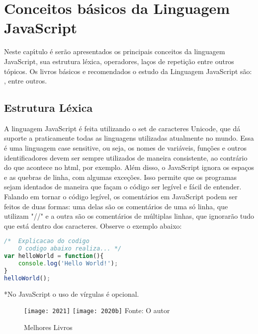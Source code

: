 


\chapter{ Conceitos b\'{a}sicos da Linguagem JavaScript}

Neste cap\'{\i}tulo \'{e} serão apresentados os principais conceitos da linguagem JavaScript, sua estrutura léxica, operadores, laços de repetição entre outros tópicos.
Os livros b\'{a}sicos e recomendados o estudo da Linguagem JavaScript s\~{a}o: \cite{flanagan2020javascript}, \cite{powers2015javascript} entre outros.


\section{Estrutura Léxica}
A linguagem JavaScript é feita utilizando o set de caracteres Unicode, que dá suporte a praticamente todas as linguagens utilizadas
atualmente no mundo. Essa é uma linguagem case sensitive, ou seja, os nomes de variáveis, funções e outros identificadores devem ser sempre utilizados de maneira consistente, ao contrário do que acontece no html, por exemplo. %
Além disso, o JavaScript ignora os espaços e as quebras de linha, com algumas exceções. Isso permite que os programas sejam identados de maneira que façam o código ser legível e fácil de entender.
Falando em tornar o código legível, os comentários em JavaScript podem ser feitos de duas formas: uma delas são os comentários de uma só linha, que utilizam "//" e a outra são os comentários de múltiplas linhas, que ignorarão tudo que está dentro dos caracteres.
Observe o exemplo abaixo:
\newline
\begin{lstlisting}[language=JavaScript]
/*  Explicacao do codigo
	O codigo abaixo realiza... */
var helloWorld = function(){
	console.log('Hello World!');
}
helloWorld();
\end{lstlisting}
*No JavaScript o uso de vírgulas é opcional.
 


   \begin{figure}[H]
    \begin{center}
        \caption{Melhores Livros} \label{livros}
        \texttt{[image: 2021]} 
                \texttt{[image: 2020b]}
        {\tiny \sf Fonte: O autor }
    \end{center}
   \end{figure} 
